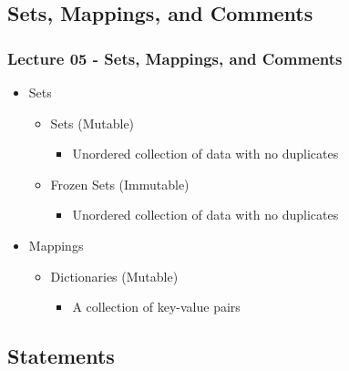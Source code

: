 \documentclass[mini frame in current subsection]{beamer}
\begin{document}
	\subsection{Sets, Mappings, and Comments}
	
		\begin{frame}
			\frametitle{Lecture 05 - Sets, Mappings, and Comments}
			\begin{itemize}
				\vfill\item  Sets
					\begin{itemize}
						\item  Sets (Mutable)
							\begin{itemize}
								\item  Unordered collection of data with no duplicates
							\end{itemize}
						\item  Frozen Sets (Immutable)
							\begin{itemize}
								\item  Unordered collection of data with no duplicates
							\end{itemize}
					\end{itemize}
				\vfill\item  Mappings
					\begin{itemize}
						\item  Dictionaries (Mutable)
							\begin{itemize}
								\item  A collection of key-value pairs
							\end{itemize}
					\end{itemize}
			\end{itemize}
		\end{frame}
		
	\subsection{Statements}
	
\end{document}
